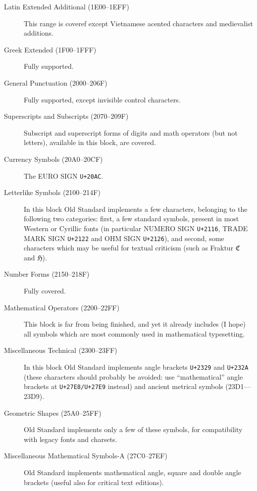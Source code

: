 \documentclass[12pt,a4paper,openany]{book}
\begin{document}
\begin{description}
\item[Latin Extended Additional (1E00–1EFF)] This range is coveref except
Vietnamese acented characters and medievalist additions.

\item[Greek Extended (1F00–1FFF)] Fully supported.

\item[General Punctuation (2000–206F)] Fully supported, except invisible
control characters.

\item[Superscripts and Subscripts (2070–209F)] Subscript and superscript
forms of digits and math operators (but not letters), available in this
block, are covered.

\item[Currency Symbols (20A0–20CF)] The EURO SIGN \texttt{U+20AC}.

\item[Letterlike Symbols (2100–214F)] In this block Old Standard implements
a few characters, belonging to the following two categories: first, a few
standard symbols, present in most Western or Cyrillic fonts (in particular
NUMERO SIGN \texttt{U+2116}, TRADE MARK SIGN \texttt{U+2122} and OHM SIGN \texttt{U+2126}), and second,
some characters which may be useful for textual criticism (such as Fraktur ℭ
and ℌ).

\item[Number Forms (2150–218F)] Fully covered.

\item[Mathematical Operators (2200–22FF)] This block is far from being
finished, and yet it already includes (I hope) all symbols which are most
commonly used in mathematical typesetting.

\item[Miscellaneous Technical (2300–23FF)] In this block Old Standard
implements angle brackets \texttt{U+2329} and \texttt{U+232A} (these characters should
probably be avoided: use “mathematical” angle brackets at \texttt{U+27E8/U+27E9}
instead) and ancient metrical symbols (23D1—23D9).

\item[Geometric Shapes (25A0–25FF)] Old Standard implements only a few of
these symbols, for compatibility with legacy fonts and charsets.

\item[Miscellaneous Mathematical Symbols-A (27C0–27EF)] Old Standard
implements mathematical angle, square and double angle brackets (useful
also for critical text editions).


\end{description}
\end{document}
